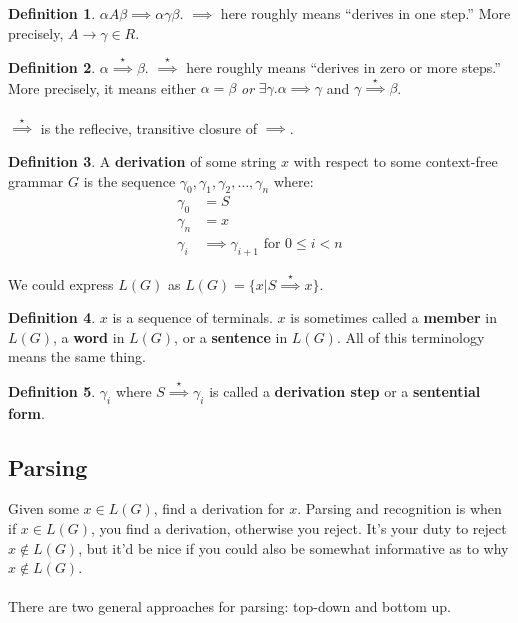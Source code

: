 \documentclass[]{article}
\theoremstyle{definition}
\newtheorem*{defn}{Definition}
\begin{document}
			\begin{defn}
				$\alpha A \beta \implies \alpha \gamma \beta$. $\implies$ here roughly means ``derives in one step.'' More precisely, $A \to \gamma \in R$.
			\end{defn}

			\begin{defn}
				$\alpha \stackrel{\star}{\implies} \beta$. $\stackrel{\star}{\implies}$ here roughly means ``derives in zero or more steps.'' More precisely, it means either $\alpha = \beta$ \emph{or} $\exists \gamma . \alpha \implies \gamma$ and $\gamma \stackrel{\star}{\implies} \beta$.
				\\ \\
				$\stackrel{\star}{\implies}$ is the reflecive, transitive closure of $\implies$.
			\end{defn}

			\begin{defn}
				A \textbf{derivation} of some string $x$ with respect to some context-free grammar $G$ is the sequence $\gamma_0, \gamma_1, \gamma_2, \ldots, \gamma_n$ where:
				\begin{align*}
					\gamma_0 &= S \\
					\gamma_n &= x \\
					\gamma_i &\implies \gamma_{i + 1} \text{ for } 0 \le i < n
				\end{align*}
			\end{defn}

			We could express $L(G)$ as $L(G) = \{ x | S \stackrel{\star}{\implies} x \}$.

			\begin{defn}
				$x$ is a sequence of terminals. $x$ is sometimes called a \textbf{member} in $L(G)$, a \textbf{word} in $L(G)$, or a \textbf{sentence} in $L(G)$. All of this terminology means the same thing.
			\end{defn}

			\begin{defn}
				$\gamma_i$ where $S \stackrel{\star}{\implies} \gamma_i$ is called a \textbf{derivation step} or a \textbf{sentential form}.
			\end{defn}
			
		\subsection{Parsing}
			Given some $x \in L(G)$, find a derivation for $x$. Parsing and recognition is when if $x \in L(G)$, you find a derivation, otherwise you reject. It's your duty to reject $x \not \in L(G)$, but it'd be nice if you could also be somewhat informative as to why $x \not \in L(G)$.
			\\ \\
			There are two general approaches for parsing: top-down and bottom up.
\end{document}
